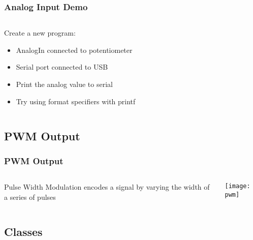 \begin{frame}[fragile]
	\frametitle{Analog Input Demo}
	\begin{columns}[T]
		\begin{column}{0.5\textwidth}
			Create a new program:
			\begin{itemize}
				\item AnalogIn connected to potentiometer
				\item Serial port connected to USB
				\item Print the analog value to serial
				\item Try using format specifiers with printf
			\end{itemize}
		\end{column}
		\pause
		\begin{column}{0.5\textwidth}
			
		\end{column}
	\end{columns}
\end{frame}

\subsection{PWM Output}
\label{sub:pwm_output}
\begin{frame}
	\frametitle{PWM Output}
	\begin{columns}[c]
		\begin{column}{0.5\textwidth}
			Pulse Width Modulation encodes a signal by varying the width of a series of pulses
		\end{column}
		\begin{column}{0.5\textwidth}
			\texttt{[image: pwm]}
		\end{column}
	\end{columns}
\end{frame}

\subsection{Classes}
\label{sub:classes}
